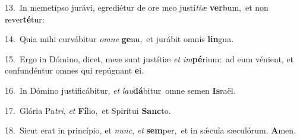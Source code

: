 {\numbfont\textcolor{\numbcolor}{13.}}~In memetípso jurávi, egrediétur de ore meo justí\-\textit{ti}\-\textit{æ} \textbf{ver}\-bum,~\star et non rever\-\textbf{té}\-tur:\par
{\numbfont\textcolor{\numbcolor}{14.}}~Quia mihi curvábitur \textit{om}\-\textit{ne} \textbf{ge}\-nu,~\star et jurábit omnis \textbf{lin}\-gua.\par
{\numbfont\textcolor{\numbcolor}{15.}}~Ergo in Dómino, dicet, meæ sunt justítiæ \textit{et} \textit{im}\-\textbf{pé}rium:~\star ad eum vénient, et confundéntur omnes qui repúgnant \textbf{e}\-i.\par
{\numbfont\textcolor{\numbcolor}{16.}}~In Dómino justificábitur, \textit{et} \textit{lau}\-\textbf{dá}bitur~\star omne semen \textbf{Is}\-raël.\par
{\numbfont\textcolor{\numbcolor}{17.}}~Glória Pa\-\textit{tri}\-, \textit{et} \textbf{Fí}\-lio,~\star et Spirítui \textbf{Sanc}\-to.\par
{\numbfont\textcolor{\numbcolor}{18.}}~Sicut erat in princípio, et \textit{nunc}\-, \textit{et} \textbf{sem}\-per,~\star et in sǽcula sæculórum. \textbf{A}\-men.\par
